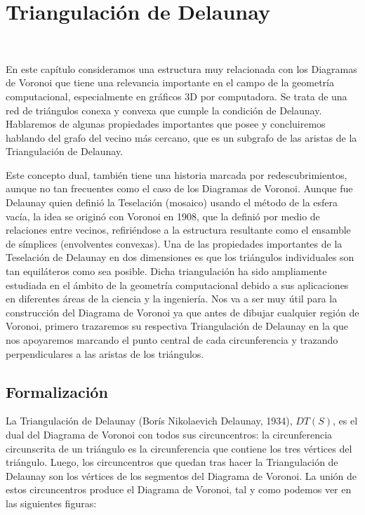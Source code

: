 \chapter{Triangulación de Delaunay}$\label{capi4}$

En este capítulo consideramos una estructura muy relacionada con los Diagramas de Voronoi que tiene una relevancia importante en el campo de la geometría computacional, especialmente en gráficos 3D por computadora. Se trata de una red de triángulos conexa y convexa que cumple la condición de Delaunay. Hablaremos de algunas propiedades importantes que posee y concluiremos hablando del grafo del vecino más cercano, que es un subgrafo de las aristas de la Triangulación de Delaunay. 

Este concepto dual, también tiene una historia marcada por redescubrimientos, aunque no tan frecuentes como el caso de los Diagramas de Voronoi. Aunque fue Delaunay quien definió la Teselación (mosaico) usando el método de la esfera vacía, la idea se originó con Voronoi en 1908, que la definió por medio de relaciones entre vecinos, refiriéndose a la estructura resultante como el ensamble de símplices (envolventes convexas). Una de las propiedades importantes de la Teselación de Delaunay en dos dimensiones es que los triángulos individuales son tan equiláteros como sea posible.
Dicha triangulación ha sido ampliamente estudiada en el ámbito de la geometría computacional debido a sus aplicaciones en diferentes áreas de la ciencia y la ingeniería. Nos va a ser muy útil para la construcción del Diagrama de Voronoi ya que antes de dibujar cualquier región de Voronoi, primero trazaremos su respectiva Triangulación de Delaunay en la que nos apoyaremos marcando el punto central de cada circunferencia y trazando perpendiculares a las aristas de los triángulos. 

\section{Formalización}

La Triangulación de Delaunay (Borís Nikolaevich Delaunay, 1934), $DT(S)$, es el dual del Diagrama de Voronoi con todos sus circuncentros: la circunferencia circunscrita de un triángulo es la circunferencia que contiene los tres vértices del triángulo.
Luego, los circuncentros que quedan tras hacer la Triangulación de Delaunay son los vértices de los segmentos del Diagrama de Voronoi. La unión de estos circuncentros produce el Diagrama de Voronoi, tal y como podemos ver en las siguientes figuras:


